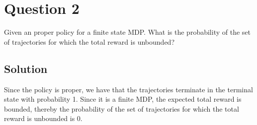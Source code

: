 \section*{Question 2}

Given an proper policy for a finite state MDP.\@
What is the probability of the set of trajectories for which the total reward is unbounded?

\subsection*{Solution}

Since the policy is proper, we have that the trajectories terminate in the terminal state with probability 1.
Since it is a finite MDP, the expected total reward is bounded, thereby the probability of the set of trajectories for which the total reward is unbounded is 0.
